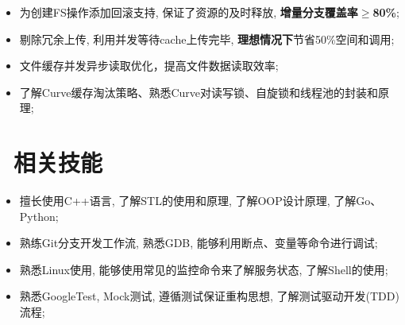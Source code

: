 \documentclass{resume}
\begin{document}
\begin{itemize}[parsep=0.2ex]
  \item 为创建FS操作添加回滚支持, 保证了资源的及时释放, \textbf{增量分支覆盖率$\geq$80\%};\enspace{}
  \item 剔除冗余上传, 利用并发等待cache上传完毕, \textbf{理想情况下}节省50\%空间和调用; \enspace{}
  \item 文件缓存并发异步读取优化，提高文件数据读取效率; \enspace{}
  \item 了解Curve缓存淘汰策略、熟悉Curve对读写锁、自旋锁和线程池的封装和原理;
\end{itemize}

\section{\faCogs\ 相关技能}
\begin{itemize}
  \item 擅长使用C++语言, 了解STL的使用和原理, 了解OOP设计原理, 了解Go、Python;
  \item 熟练Git分支开发工作流, 熟悉GDB, 能够利用断点、变量等命令进行调试;
  \item 熟悉Linux使用, 能够使用常见的监控命令来了解服务状态, 了解Shell的使用;
  \item 熟悉GoogleTest, Mock测试, 遵循测试保证重构思想, 了解测试驱动开发(TDD)流程;
\end{itemize}

\end{document}
